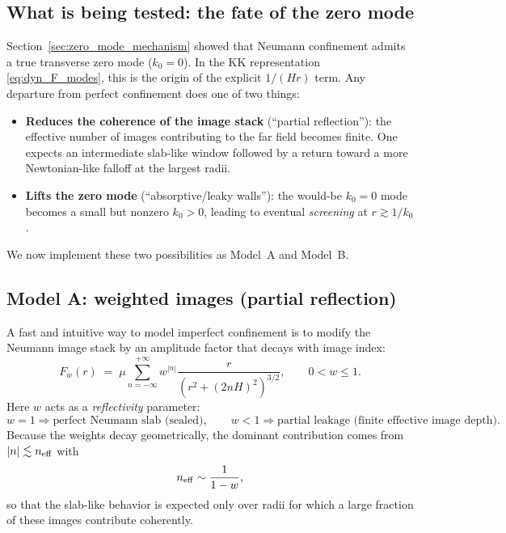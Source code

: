 \documentclass[11pt]{article}
\begin{document}
\subsection{What is being tested: the fate of the zero mode}
\label{sec:leaky_zeromode}

Section~\ref{sec:zero_mode_mechanism} showed that Neumann confinement admits a true transverse
zero mode ($k_0=0$).  In the KK representation \eqref{eq:dyn_F_modes}, this is the origin of the
explicit $1/(Hr)$ term.  Any departure from perfect confinement does one of two things:

\begin{itemize}
\item \textbf{Reduces the coherence of the image stack} (``partial reflection''): the effective
      number of images contributing to the far field becomes finite.  One expects an intermediate
      slab-like window followed by a return toward a more Newtonian-like falloff at the largest
      radii.
\item \textbf{Lifts the zero mode} (``absorptive/leaky walls''): the would-be $k_0=0$ mode becomes a
      small but nonzero $k_0>0$, leading to eventual \emph{screening} at $r\gtrsim 1/k_0$.
\end{itemize}

We now implement these two possibilities as Model~A and Model~B.

\subsection{Model A: weighted images (partial reflection)}
\label{sec:leaky_weighted_images}

A fast and intuitive way to model imperfect confinement is to modify the Neumann image stack by an
amplitude factor that decays with image index:
\begin{equation}
  F_{w}(r)
  \;=\;
  \mu \sum_{n=-\infty}^{+\infty} w^{|n|}
  \frac{r}{\left(r^2+(2nH)^2\right)^{3/2}},
  \qquad 0<w\le 1.
  \label{eq:leaky_weighted_images_force}
\end{equation}
Here $w$ acts as a \emph{reflectivity} parameter:
\begin{equation}
  w=1 \Rightarrow \text{perfect Neumann slab (sealed)},
  \qquad
  w<1 \Rightarrow \text{partial leakage (finite effective image depth)}.
\end{equation}
Because the weights decay geometrically, the dominant contribution comes from
$|n|\lesssim n_{\rm eff}$ with
\begin{equation}
  n_{\rm eff}\sim \frac{1}{1-w},
  \label{eq:leaky_neff}
\end{equation}
so that the slab-like behavior is expected only over radii for which a large fraction of these
images contribute coherently.
\end{document}
